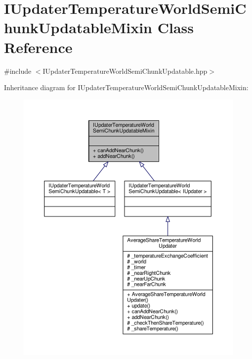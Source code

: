 \hypertarget{class_i_updater_temperature_world_semi_chunk_updatable_mixin}{\section{I\-Updater\-Temperature\-World\-Semi\-Chunk\-Updatable\-Mixin Class Reference}
\label{class_i_updater_temperature_world_semi_chunk_updatable_mixin}
}


{\ttfamily \#include $<$I\-Updater\-Temperature\-World\-Semi\-Chunk\-Updatable.\-hpp$>$}



Inheritance diagram for I\-Updater\-Temperature\-World\-Semi\-Chunk\-Updatable\-Mixin\-:
\nopagebreak
\begin{figure}[H]
\begin{center}
\leavevmode
\includegraphics[width=350pt]{class_i_updater_temperature_world_semi_chunk_updatable_mixin__inherit__graph}
\end{center}
\end{figure}


